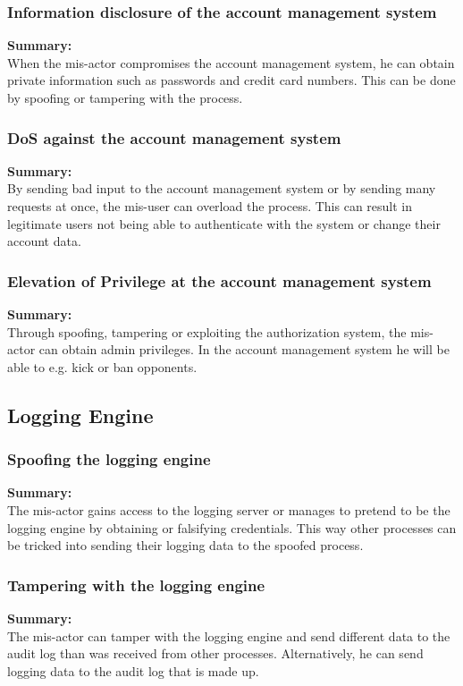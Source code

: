 \documentclass[a4paper,11pt]{report}
\begin{document}
\subsubsection{Information disclosure of the account management system}
\label{AccountManagementCasesI}
\textbf{Summary:} \\
When the mis-actor compromises the account management system, he can obtain private information such as passwords and credit card numbers. This can be done by spoofing or tampering with the process.

\subsubsection{DoS against the account management system}
\label{AccountManagementCasesD}
\textbf{Summary:} \\
By sending bad input to the account management system or by sending many requests at once, the mis-user can overload the process. This can result in legitimate users not being able to authenticate with the system or change their account data.

\subsubsection{Elevation of Privilege at the account management system}
\label{AccountManagementCasesE}
\textbf{Summary:} \\
Through spoofing, tampering or exploiting the authorization system, the mis-actor can obtain admin privileges. In the account management system he will be able to e.g. kick or ban opponents.

\subsection{Logging Engine}
\label{LoggingEngineCases}

\subsubsection{Spoofing the logging engine}
\label{LoggingEngineCasesS}
\textbf{Summary:} \\
The mis-actor gains access to the logging server or manages to pretend to be the logging engine by obtaining or falsifying credentials. This way other processes can be tricked into sending their logging data to the spoofed process.

\subsubsection{Tampering with the logging engine}
\label{LoggingEngineCasesT}
\textbf{Summary:} \\
The mis-actor can tamper with the logging engine and send different data to the audit log than was received from other processes. Alternatively, he can send logging data to the audit log that is made up.
\end{document}
